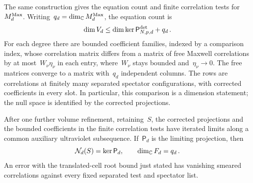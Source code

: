 The same construction gives the equation count and finite correlation tests for~$M_{d}^{\mathrm{Max}}$. Writing~$q_d=\dim_{\mathbb{C}}M_{d}^{\mathrm{Max}}$, the equation count is
\begin{equation}\label{eq:F-equation-count}
\dim V_d\le\dim\ker\mathsf P^{\rm det}_{N,p,d}+q_d\,.
\end{equation}
For each degree there are bounded coefficient families, indexed by a comparison index, whose correlation matrix differs from a matrix of free Maxwell correlations by at most~$W_\nu\eta_\nu$ in each entry, where~$W_\nu$ stays bounded and~$\eta_\nu\to0$. The free matrices converge to a matrix with~$q_d$ independent columns. The rows are correlations at finitely many separated spectator configurations, with corrected coefficients in every slot. In particular, this comparison is a dimension statement; the null space is identified by the corrected projections.

\begin{lemma}\label{lem:F-null}
After one further volume refinement, retaining~$S$, the corrected projections and the bounded coefficients in the finite correlation tests have iterated limits along a common auxiliary ultraviolet subsequence. If~$\mathsf P_d$ is the limiting projection, then
\begin{equation}\label{eq:F-null-rank}
\mathcal{N}_{d}(S)=\ker\mathsf P_d,\qquad \dim_{\mathbb{C}} F_d=q_d\,.
\end{equation}
An error with the translated-cell root bound just stated has vanishing smeared correlations against every fixed separated test and spectator list.
\end{lemma}

